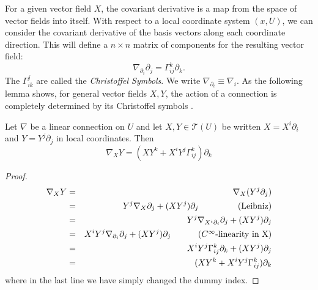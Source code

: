 For a given vector field $X$, the covariant derivative is a map from the space of vector fields into itself. With respect to a local coordinate system $(x,U)$, we can consider the covariant derivative of the basis vectors along each coordinate direction. This will define a $n\times n$ matrix of components for the resulting vector field:
\[ \nabla_{\partial_i} \partial_j = \Gamma^k_{ij}\partial_k. \]
The $\Gamma^j_{ik}$ are called the \textit{Christoffel Symbols}. We write $\nabla_{\partial_i}\equiv \nabla_i$. As the following lemma shows, for general vector fields $X,Y$, the action of a connection is completely determined by its Christoffel symbols \cite{Lee}. 

\begin{lemma}
Let $\nabla$ be a linear connection on $U$ and let $X,Y\in \mathcal{T}(U)$ be written $X=X^i\partial_i$ and $Y=Y^j\partial_j$ in local coordinates. Then
\[ \nabla_X Y= (XY^k + X^i Y^j \Gamma^k_{ij})\partial_k \]
\end{lemma}
\begin{proof}
\begin{eqnarray*}
\nabla_X Y &=& \nabla_X (Y^j \partial_j)\\
&=& Y^j \nabla_X \partial_j + (XY^j)\partial_j \mbox{\hspace{1.5cm} (Leibniz)}\\
&=& Y^j \nabla_{X^i \partial_i}\partial_j + (XY^j)\partial_j \\
&=& X^i Y^j \nabla_{\partial_i}\partial_j + (XY^j)\partial_j \mbox{\hspace{1cm} ($C^\infty$-linearity in X)}\\
&=& X^i Y^j \Gamma^k_{ij}\partial_k + (XY^j)\partial_j \\
&=& (XY^k + X^i Y^j \Gamma^k_{ij})\partial_k 
\end{eqnarray*}
where in the last line we have simply changed the dummy index.
\end{proof}

